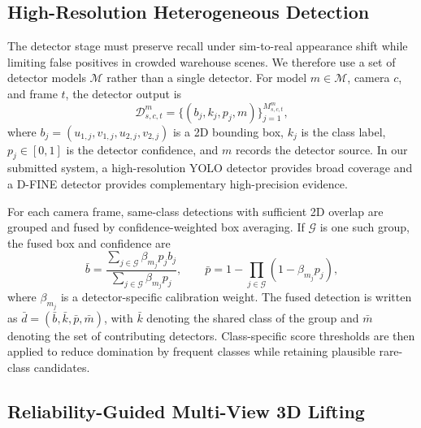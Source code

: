 \documentclass[runningheads]{llncs}
\begin{document}
\subsection{High-Resolution Heterogeneous Detection}
\label{sec:method_detection}

The detector stage must preserve recall under sim-to-real appearance shift while
limiting false positives in crowded warehouse scenes. We therefore use a set of
detector models $\mathcal{M}$ rather than a single detector. For model
$m\in\mathcal{M}$, camera $c$, and frame $t$, the detector output is
\begin{equation}
    \mathcal{D}^{m}_{s,c,t}
    =
    \{(b_j,k_j,p_j,m)\}_{j=1}^{M_{s,c,t}^{m}},
    \label{eq:detector_set}
\end{equation}
where $b_j=(u_{1,j},v_{1,j},u_{2,j},v_{2,j})$ is a 2D bounding box, $k_j$ is the
class label, $p_j\in[0,1]$ is the detector confidence, and $m$ records the detector
source. In our submitted system, a high-resolution YOLO detector provides broad
coverage and a D-FINE detector provides complementary high-precision evidence.

For each camera frame, same-class detections with sufficient 2D overlap are grouped
and fused by confidence-weighted box averaging. If $\mathcal{G}$ is one such group,
the fused box and confidence are
\begin{equation}
    \bar{b}
    =
    \frac{\sum_{j\in\mathcal{G}}\beta_{m_j}p_j b_j}
         {\sum_{j\in\mathcal{G}}\beta_{m_j}p_j},
    \qquad
    \bar{p}
    =
    1-\prod_{j\in\mathcal{G}}(1-\beta_{m_j}p_j),
    \label{eq:detector_fusion}
\end{equation}
where $\beta_{m_j}$ is a detector-specific calibration weight. The fused detection
is written as $\bar{d}=(\bar{b},\bar{k},\bar{p},\bar{m})$, with $\bar{k}$ denoting
the shared class of the group and $\bar{m}$ denoting the set of contributing
detectors. Class-specific score thresholds are then applied to reduce domination by
frequent classes while retaining plausible rare-class candidates.

\subsection{Reliability-Guided Multi-View 3D Lifting}
\label{sec:method_lifting}
\end{document}

